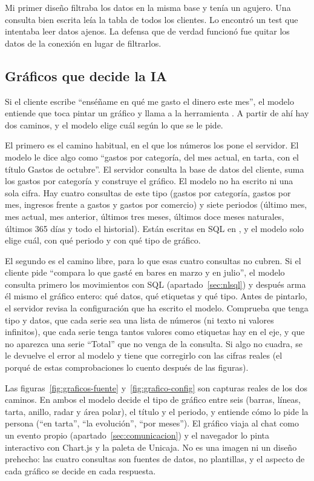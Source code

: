 Mi primer diseño filtraba los datos en la misma base y tenía un agujero. Una consulta bien escrita leía la tabla de
todos los clientes. Lo encontró un test que intentaba leer datos ajenos. La defensa que de verdad funcionó fue quitar
los datos de la conexión en lugar de filtrarlos.

\subsection{Gráficos que decide la IA}\label{sec:graficos}

Si el cliente escribe ``enséñame en qué me gasto el dinero este mes'', el modelo entiende que toca pintar un gráfico
y llama a la herramienta . A partir de ahí hay dos caminos, y el modelo elige cuál según lo que
se le pide.

El primero es el camino habitual, en el que los números los pone el servidor. El modelo le dice algo como ``gastos por
categoría, del mes actual, en tarta, con el título Gastos de octubre''. El servidor consulta la base de datos del
cliente, suma los gastos por categoría y construye el gráfico. El modelo no ha escrito ni una sola cifra. Hay cuatro
consultas de este tipo (gastos por categoría, gastos por mes, ingresos frente a gastos y gastos por comercio) y siete
periodos (último mes, mes actual, mes anterior, últimos tres meses, últimos doce meses naturales, últimos 365 días y
todo el historial). Están escritas en SQL en , y el modelo solo elige cuál,
con qué periodo y con qué tipo de gráfico.

El segundo es el camino libre, para lo que esas cuatro consultas no cubren. Si el cliente pide ``compara lo que gasté
en bares en marzo y en julio'', el modelo consulta primero los movimientos con SQL (apartado~\ref{sec:nlsql}) y después
arma él mismo el gráfico entero: qué datos, qué etiquetas y qué tipo. Antes de pintarlo, el servidor revisa la configuración
que ha escrito el modelo. Comprueba que tenga tipo y datos, que cada serie sea una lista de números (ni texto ni valores
infinitos), que cada serie tenga tantos valores como etiquetas hay en el eje, y que no aparezca una serie ``Total'' que
no venga de la consulta. Si algo no cuadra, se le devuelve el error al modelo y tiene que corregirlo con las cifras
reales (el porqué de estas comprobaciones lo cuento después de las figuras).

Las figuras~\ref{fig:graficos-fuente} y~\ref{fig:grafico-config} son capturas reales de los dos caminos.
En ambos el modelo decide el tipo de gráfico entre seis (barras, líneas, tarta, anillo, radar y área polar),
el título y el periodo, y entiende cómo lo pide la persona (``en tarta'', ``la evolución'', ``por meses''). El gráfico
viaja al chat como un evento propio (apartado~\ref{sec:comunicacion}) y el navegador lo pinta interactivo con
Chart.js y la paleta de Unicaja. No es una imagen ni un diseño prehecho: las cuatro consultas son fuentes de datos,
no plantillas, y el aspecto de cada gráfico se decide en cada respuesta.

